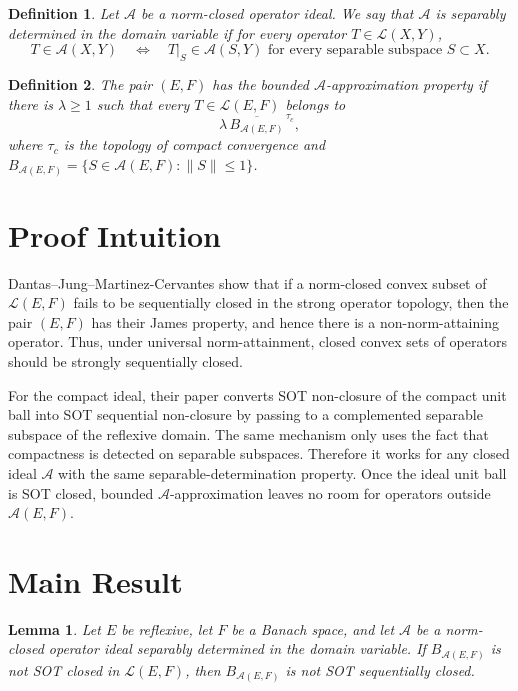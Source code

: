 \documentclass[11pt]{amsart}
\newtheorem{lemma}{Lemma}
\newtheorem{definition}{Definition}
\newcommand{\A}{\mathcal A}
\newcommand{\Lin}{\mathcal L}
\newcommand{\Ball}{B}
\begin{document}
\begin{definition}
Let \(\A\) be a norm-closed operator ideal.  We say that \(\A\) is
\emph{separably determined in the domain variable} if for every operator
\(T\in \Lin(X,Y)\),
\[
T\in \A(X,Y)
\quad\Longleftrightarrow\quad
T|_S\in \A(S,Y)\text{ for every separable subspace }S\subset X .
\]
\end{definition}

\begin{definition}
The pair \((E,F)\) has the \emph{bounded \(\A\)-approximation property} if
there is \(\lambda\geq 1\) such that every \(T\in\Lin(E,F)\) belongs to
\[
\lambda\,\overline{\Ball_{\A(E,F)}}^{\,\tau_c},
\]
where \(\tau_c\) is the topology of compact convergence and
\(\Ball_{\A(E,F)}=\{S\in\A(E,F):\|S\|\leq 1\}\).
\end{definition}

\section{Proof Intuition}

Dantas--Jung--Martinez-Cervantes show that if a norm-closed convex subset of
\(\Lin(E,F)\) fails to be sequentially closed in the strong operator topology,
then the pair \((E,F)\) has their James property, and hence there is a
non-norm-attaining operator.  Thus, under universal norm-attainment, closed
convex sets of operators should be strongly sequentially closed.

For the compact ideal, their paper converts SOT non-closure of the compact
unit ball into SOT sequential non-closure by passing to a complemented
separable subspace of the reflexive domain.  The same mechanism only uses the
fact that compactness is detected on separable subspaces.  Therefore it works
for any closed ideal \(\A\) with the same separable-determination property.
Once the ideal unit ball is SOT closed, bounded \(\A\)-approximation leaves no
room for operators outside \(\A(E,F)\).

\section{Main Result}

\begin{lemma}\label{lem:sot}
Let \(E\) be reflexive, let \(F\) be a Banach space, and let \(\A\) be a
norm-closed operator ideal separably determined in the domain variable.  If
\(\Ball_{\A(E,F)}\) is not SOT closed in \(\Lin(E,F)\), then
\(\Ball_{\A(E,F)}\) is not SOT sequentially closed.
\end{lemma}
\end{document}

